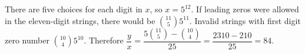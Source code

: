 There are five choices for each digit in $x$, so $x=5^{12}$. If leading zeros were allowed in the eleven-digit strings, there would be $\binom{11}{5}5^{11}$. Invalid strings with first digit zero number $\binom{10}{4}5^{10}$. Therefore $\dfrac{y}{x}=\dfrac{5\binom{11}{5}-\binom{10}{4}}{25}=\dfrac{2310-210}{25}=\boxed{84}$.
